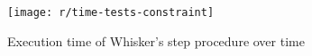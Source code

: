 \begin{figure}[htpb]
    \centering
    \texttt{[image: r/time-tests-constraint]}
    \caption{Execution time of Whisker's step procedure over time}
    \label{fig:time_tests_constraint}
\end{figure}


